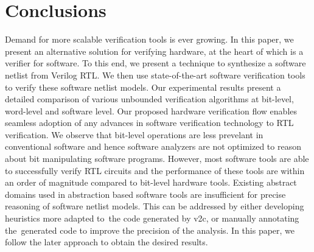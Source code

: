 \section{Conclusions}\label{sec:concl}
%
Demand for more scalable verification tools is ever growing.  In this paper,
we present an alternative solution for verifying hardware, at the heart of
which is a verifier for software.  To this end, we present a technique to 
synthesize a software netlist from Verilog RTL.  We then use state-of-the-art
software verification tools to verify these software netlist models.  Our 
experimental results present a detailed comparison of various unbounded 
verification algorithms at bit-level, word-level and software level.  Our proposed 
hardware verification flow enables seamless adoption of any advances in software 
verification technology to RTL verification.  We observe that bit-level operations 
are less prevelant in conventional software and hence software analyzers are not 
optimized to reason about bit manipulating software programs.  However, most software 
tools are able to successfully verify RTL circuits and the performance of these tools 
are within an order of magnitude compared to bit-level hardware tools.  Existing abstract 
domains used in abstraction based software tools are insufficient for precise reasoning 
of software netlist models.  This can be addressed by either developing heuristics 
more adapted to the code generated by v2c, or manually annotating the generated code 
to improve the precision of the analysis. In this paper, we follow the later approach 
to obtain the desired results. 
